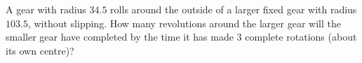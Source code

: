 A gear with radius $34.5$ rolls around the outside of a larger fixed gear with radius $103.5$, without slipping. How many revolutions around the larger gear will the smaller gear have completed by the time it has made $3$ complete rotations (about its own centre)?
